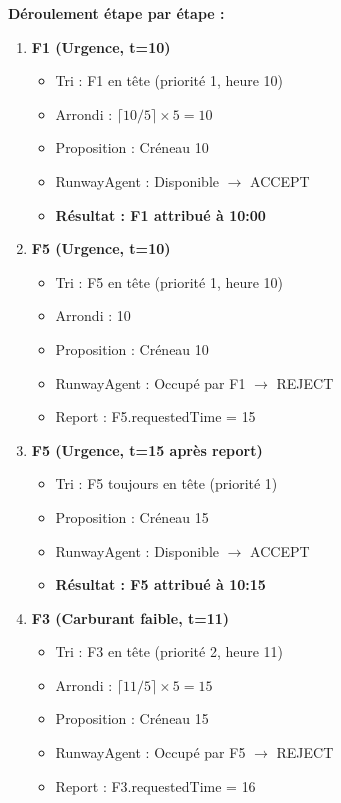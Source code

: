 \documentclass[12pt,a4paper]{article}
\begin{document}
\textbf{Déroulement étape par étape :}

\begin{enumerate}[leftmargin=*, label=\textcolor{primaryblue}{\textbf{Cycle \arabic*:}}]
    \item \textbf{F1 (Urgence, t=10)}
    \begin{itemize}
        \item Tri : F1 en tête (priorité 1, heure 10)
        \item Arrondi : $\lceil 10/5 \rceil \times 5 = 10$
        \item Proposition : Créneau 10
        \item RunwayAgent : Disponible $\rightarrow$ ACCEPT
        \item \textbf{Résultat : F1 attribué à 10:00}
    \end{itemize}

    \item \textbf{F5 (Urgence, t=10)}
    \begin{itemize}
        \item Tri : F5 en tête (priorité 1, heure 10)
        \item Arrondi : 10
        \item Proposition : Créneau 10
        \item RunwayAgent : Occupé par F1 $\rightarrow$ REJECT
        \item Report : F5.requestedTime = 15
    \end{itemize}

    \item \textbf{F5 (Urgence, t=15 après report)}
    \begin{itemize}
        \item Tri : F5 toujours en tête (priorité 1)
        \item Proposition : Créneau 15
        \item RunwayAgent : Disponible $\rightarrow$ ACCEPT
        \item \textbf{Résultat : F5 attribué à 10:15}
    \end{itemize}

    \item \textbf{F3 (Carburant faible, t=11)}
    \begin{itemize}
        \item Tri : F3 en tête (priorité 2, heure 11)
        \item Arrondi : $\lceil 11/5 \rceil \times 5 = 15$
        \item Proposition : Créneau 15
        \item RunwayAgent : Occupé par F5 $\rightarrow$ REJECT
        \item Report : F3.requestedTime = 16
    \end{itemize}


\end{enumerate}
\end{document}
